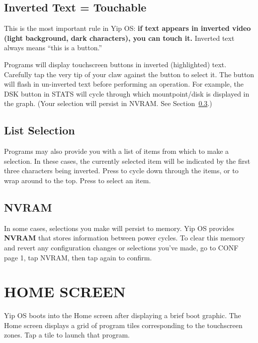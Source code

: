 \documentclass[10pt]{article}
\newcommand{\key}[1]{\fbox{\texttt{\footnotesize #1}}}
\begin{document}
\subsection{Inverted Text = Touchable}
\label{sec:inverted}

\begin{warnbox}
This is the most important rule in Yip OS: \textbf{if text appears in inverted video (light background, dark characters), you can touch it.} Inverted text always means ``this is a button.''
\end{warnbox}

Programs will display touchscreen buttons in inverted (highlighted) text. Carefully tap the very tip of your claw against the button to select it. The button will flash in un-inverted text before performing an operation. For example, the DSK button in STATS will cycle through which mountpoint/disk is displayed in the graph. (Your selection will persist in NVRAM. See Section~\ref{sec:nvram}.)

\subsection{List Selection}

Programs may also provide you with a list of items from which to make a selection. In these cases, the currently selected item will be indicated by the first three characters being inverted. Press \key{JOYSTICK} to cycle down through the items, or to wrap around to the top. Press \key{SEL} to select an item.

\subsection{NVRAM}
\label{sec:nvram}

In some cases, selections you make will persist to memory. Yip OS provides \textbf{NVRAM} that stores information between power cycles. To clear this memory and revert any configuration changes or selections you've made, go to CONF page 1, tap NVRAM, then tap again to confirm.

\newpage
\section{HOME SCREEN}
\label{sec:home}

Yip OS boots into the Home screen after displaying a brief boot graphic. The Home screen displays a grid of program tiles corresponding to the touchscreen zones. Tap a tile to launch that program.
\end{document}
